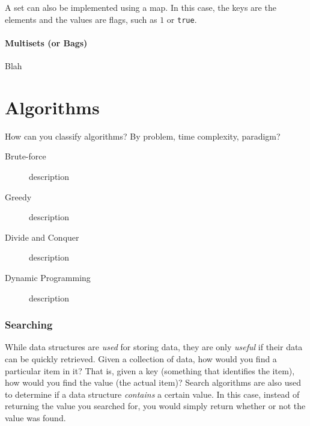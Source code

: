 A set can also be implemented using a map. In this case, the keys are the elements and the values are flags, such as $1$ or \texttt{true}. \\


\subsection{Multisets (or Bags)}

Blah

\newpage


\part*{Algorithms}

How can you classify algorithms? By problem, time complexity, paradigm? 

\begin{description}
	\item[Brute-force] description
	\item[Greedy] description
	\item[Divide and Conquer] description
	\item[Dynamic Programming] description
\end{description}


\toclineskip
\section{Searching}

While data structures are \textit{used} for storing data, they are only \textit{useful} if their data can be quickly retrieved. Given a collection of data, how would you find a particular item in it? That is, given a key (something that identifies the item), how would you find the value (the actual item)? Search algorithms are also used to determine if a data structure \textit{contains} a certain value. In this case, instead of returning the value you searched for, you would simply return whether or not the value was found. \\


